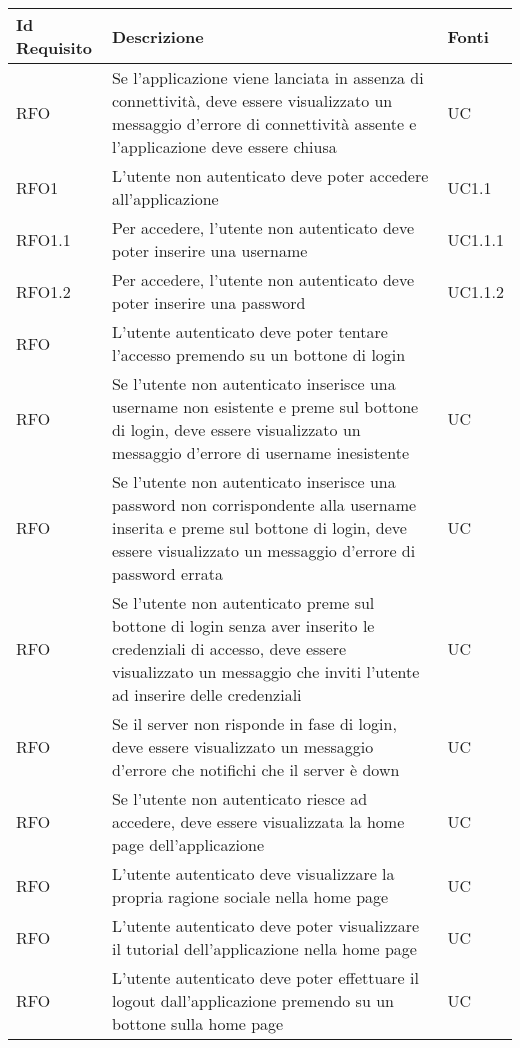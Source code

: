 \begin{center}
\begin{longtable}{ | >{\centering\arraybackslash}m{2.5cm} | >{\centering\arraybackslash}m{8cm} | >{\centering\arraybackslash}m{2.5cm} | }
        
\hline
\textbf{Id Requisito} & \textbf{Descrizione} & \textbf{Fonti} \\ \hline
\endhead
RFO & Se l'applicazione viene lanciata in assenza di connettività, deve essere visualizzato un messaggio d'errore di connettività assente e l'applicazione deve essere chiusa & UC \\ \hline
RFO1 & L'utente non autenticato deve poter accedere all'applicazione & UC1.1 \\ \hline
RFO1.1 & Per accedere, l'utente non autenticato deve poter inserire una username & UC1.1.1 \\ \hline
RFO1.2 & Per accedere, l'utente non autenticato deve poter inserire una password & UC1.1.2 \\ \hline
RFO & L'utente autenticato deve poter tentare l'accesso premendo su un bottone di login & \\ \hline
RFO & Se l'utente non autenticato inserisce una username non esistente e preme sul bottone di login, deve essere visualizzato un messaggio d'errore di username inesistente & UC \\ \hline
RFO & Se l'utente non autenticato inserisce una password non corrispondente alla username inserita e preme sul bottone di login, deve essere visualizzato un messaggio d'errore di password errata & UC \\ \hline
RFO & Se l'utente non autenticato preme sul bottone di login senza aver inserito le credenziali di accesso, deve essere visualizzato un messaggio che inviti l'utente ad inserire delle credenziali & UC \\ \hline
RFO & Se il server non risponde in fase di login, deve essere visualizzato un messaggio d'errore che notifichi che il server è down & UC \\ \hline
RFO & Se l'utente non autenticato riesce ad accedere, deve essere visualizzata la home page dell'applicazione & UC \\ \hline
RFO & L'utente autenticato deve visualizzare la propria ragione sociale nella home page & UC \\ \hline
RFO & L'utente autenticato deve poter visualizzare il tutorial dell'applicazione nella home page & UC \\ \hline
RFO & L'utente autenticato deve poter effettuare il logout dall'applicazione premendo su un bottone sulla home page& UC \\ \hline

\end{longtable}
\end{center}
